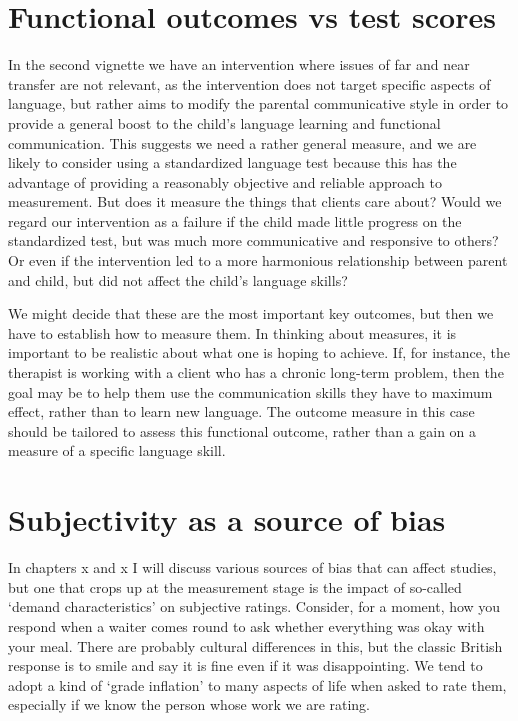 \documentclass[]{book}
\begin{document}
\hypertarget{functional-outcomes-vs-test-scores}{%
\section{Functional outcomes vs test scores}\label{functional-outcomes-vs-test-scores}}

In the second vignette we have an intervention where issues of far and near transfer are not relevant, as the intervention does not target specific aspects of language, but rather aims to modify the parental communicative style in order to provide a general boost to the child's language learning and functional communication. This suggests we need a rather general measure, and we are likely to consider using a standardized language test because this has the advantage of providing a reasonably objective and reliable approach to measurement. But does it measure the things that clients care about? Would we regard our intervention as a failure if the child made little progress on the standardized test, but was much more communicative and responsive to others? Or even if the intervention led to a more harmonious relationship between parent and child, but did not affect the child's language skills?

We might decide that these are the most important key outcomes, but then we have to establish how to measure them. In thinking about measures, it is important to be realistic about what one is hoping to achieve. If, for instance, the therapist is working with a client who has a chronic long-term problem, then the goal may be to help them use the communication skills they have to maximum effect, rather than to learn new language. The outcome measure in this case should be tailored to assess this functional outcome, rather than a gain on a measure of a specific language skill.

\hypertarget{subjectivity-as-a-source-of-bias}{%
\section{Subjectivity as a source of bias}\label{subjectivity-as-a-source-of-bias}}

In chapters x and x I will discuss various sources of bias that can affect studies, but one that crops up at the measurement stage is the impact of so-called `demand characteristics' on subjective ratings. Consider, for a moment, how you respond when a waiter comes round to ask whether everything was okay with your meal. There are probably cultural differences in this, but the classic British response is to smile and say it is fine even if it was disappointing. We tend to adopt a kind of `grade inflation' to many aspects of life when asked to rate them, especially if we know the person whose work we are rating.
\end{document}
